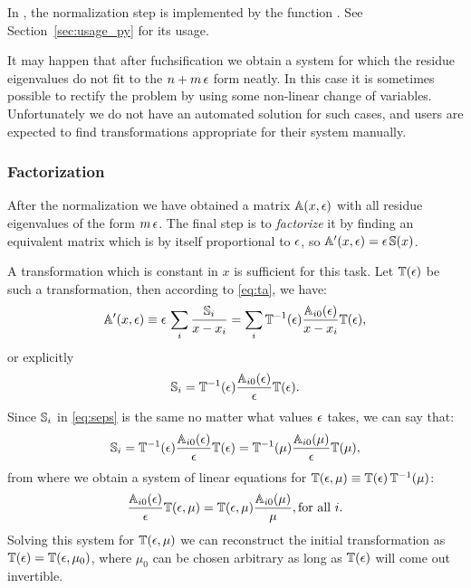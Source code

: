 \documentclass[12pt,a4paper]{article}
\begin{document}
In \fuchsia, the normalization step is implemented by the function .
See Section~\ref{sec:usage_py} for its usage.

It may happen that after fuchsification we obtain a system for which the residue eigenvalues do not fit to the $n+m\,\epsilon$ form neatly.
In this case it is sometimes possible to rectify the problem by using some non-linear change of variables.
Unfortunately we do not have an automated solution for such cases, and users are expected to find transformations appropriate for their system manually.


\subsubsection{Factorization}
\label{sec:fact}
After the normalization we have obtained a matrix $\mathbb{A}(x,\epsilon)$ with all residue eigenvalues of the form $m\,\epsilon$.
The final step is to \textit{factorize} it by finding an equivalent matrix which is by itself proportional to $\epsilon$, so $\mathbb{A}'(x,\epsilon)=\epsilon\,\mathbb{S}(x)$.

A transformation which is constant in $x$ is sufficient for this task.
Let $\mathbb{T}(\epsilon)$ be such a transformation, then according to \eqref{eq:ta}, we have:
\begin{equation}
  \mathbb{A}'(x,\epsilon) \equiv \epsilon\, \sum_i \frac{\mathbb{S}_i}{x-x_i} = \sum_i \mathbb{T}^{-1}(\epsilon) \frac{\mathbb{A}_{i0}(\epsilon)}{x-x_i} \mathbb{T}(\epsilon),
\end{equation}
or explicitly
\begin{equation}
\label{eq:seps}
  \mathbb{S}_i = \mathbb{T}^{-1}(\epsilon) \frac{\mathbb{A}_{i0}(\epsilon)}{\epsilon} \mathbb{T}(\epsilon).
\end{equation}
Since $\mathbb{S}_i$ in \eqref{eq:seps} is the same no matter what values $\epsilon$ takes, we can say that:
\begin{equation}
  \mathbb{S}_i = \mathbb{T}^{-1}(\epsilon) \frac{\mathbb{A}_{i0}(\epsilon)}{\epsilon} \mathbb{T}(\epsilon) =
    \mathbb{T}^{-1}(\mu) \frac{\mathbb{A}_{i0}(\mu)}{\epsilon} \mathbb{T}(\mu),
\end{equation}
from where we obtain a system of linear equations for $\mathbb{T}(\epsilon,\mu) \equiv \mathbb{T}(\epsilon) \, \mathbb{T}^{-1}(\mu)$:
\begin{equation}
  \frac{\mathbb{A}_{i0}(\epsilon)}{\epsilon} \mathbb{T}(\epsilon,\mu) = \mathbb{T}(\epsilon,\mu) \frac{\mathbb{A}_{i0}(\mu)}{\mu}, \text{for all $i$.}
\end{equation}
Solving this system for $\mathbb{T}(\epsilon,\mu)$ we can reconstruct the initial transformation as $\mathbb{T}(\epsilon) = \mathbb{T}(\epsilon,\mu_0)$, where $\mu_0$ can be chosen arbitrary as long as $\mathbb{T}(\epsilon)$ will come out invertible.
\end{document}
